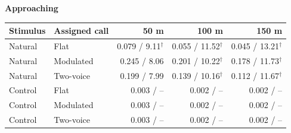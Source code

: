\begin{center}\begin{minipage}{.94\linewidth}\centering\small
\textbf{Approaching}\\[3pt]
\begin{tabular}{llrrr}\toprule
Stimulus & Assigned call & 50 m & 100 m & 150 m\\\midrule
Natural & Flat & 0.079 / 9.11$^\dagger$ & 0.055 / 11.52$^\dagger$ & 0.045 / 13.21$^\dagger$\\
Natural & Modulated & 0.245 / 8.06 & 0.201 / 10.22$^\dagger$ & 0.178 / 11.73$^\dagger$\\
Natural & Two-voice & 0.199 / 7.99 & 0.139 / 10.16$^\dagger$ & 0.112 / 11.67$^\dagger$\\
Control & Flat & 0.003 / -- & 0.002 / -- & 0.002 / --\\
Control & Modulated & 0.003 / -- & 0.002 / -- & 0.002 / --\\
Control & Two-voice & 0.003 / -- & 0.002 / -- & 0.002 / --\\
\bottomrule\end{tabular}
\end{minipage}\end{center}
